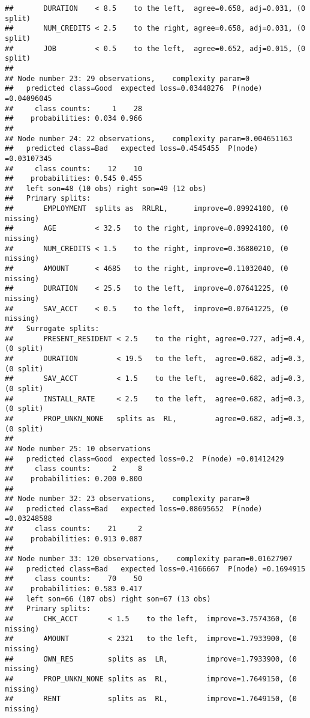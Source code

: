 \documentclass[
]{article}
\begin{document}
\begin{verbatim}
##       DURATION    < 8.5    to the left,  agree=0.658, adj=0.031, (0 split)
##       NUM_CREDITS < 2.5    to the right, agree=0.658, adj=0.031, (0 split)
##       JOB         < 0.5    to the left,  agree=0.652, adj=0.015, (0 split)
## 
## Node number 23: 29 observations,    complexity param=0
##   predicted class=Good  expected loss=0.03448276  P(node) =0.04096045
##     class counts:     1    28
##    probabilities: 0.034 0.966 
## 
## Node number 24: 22 observations,    complexity param=0.004651163
##   predicted class=Bad   expected loss=0.4545455  P(node) =0.03107345
##     class counts:    12    10
##    probabilities: 0.545 0.455 
##   left son=48 (10 obs) right son=49 (12 obs)
##   Primary splits:
##       EMPLOYMENT  splits as  RRLRL,      improve=0.89924100, (0 missing)
##       AGE         < 32.5   to the right, improve=0.89924100, (0 missing)
##       NUM_CREDITS < 1.5    to the right, improve=0.36880210, (0 missing)
##       AMOUNT      < 4685   to the right, improve=0.11032040, (0 missing)
##       DURATION    < 25.5   to the left,  improve=0.07641225, (0 missing)
##       SAV_ACCT    < 0.5    to the left,  improve=0.07641225, (0 missing)
##   Surrogate splits:
##       PRESENT_RESIDENT < 2.5    to the right, agree=0.727, adj=0.4, (0 split)
##       DURATION         < 19.5   to the left,  agree=0.682, adj=0.3, (0 split)
##       SAV_ACCT         < 1.5    to the left,  agree=0.682, adj=0.3, (0 split)
##       INSTALL_RATE     < 2.5    to the left,  agree=0.682, adj=0.3, (0 split)
##       PROP_UNKN_NONE   splits as  RL,         agree=0.682, adj=0.3, (0 split)
## 
## Node number 25: 10 observations
##   predicted class=Good  expected loss=0.2  P(node) =0.01412429
##     class counts:     2     8
##    probabilities: 0.200 0.800 
## 
## Node number 32: 23 observations,    complexity param=0
##   predicted class=Bad   expected loss=0.08695652  P(node) =0.03248588
##     class counts:    21     2
##    probabilities: 0.913 0.087 
## 
## Node number 33: 120 observations,    complexity param=0.01627907
##   predicted class=Bad   expected loss=0.4166667  P(node) =0.1694915
##     class counts:    70    50
##    probabilities: 0.583 0.417 
##   left son=66 (107 obs) right son=67 (13 obs)
##   Primary splits:
##       CHK_ACCT       < 1.5    to the left,  improve=3.7574360, (0 missing)
##       AMOUNT         < 2321   to the left,  improve=1.7933900, (0 missing)
##       OWN_RES        splits as  LR,         improve=1.7933900, (0 missing)
##       PROP_UNKN_NONE splits as  RL,         improve=1.7649150, (0 missing)
##       RENT           splits as  RL,         improve=1.7649150, (0 missing)

\end{verbatim}
\end{document}
